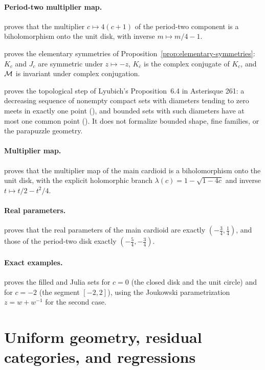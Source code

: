 \paragraph{Period-two multiplier map.}
 proves that the multiplier $c\mapsto4(c+1)$ of the period-two component is a biholomorphism onto the unit disk, with inverse $m\mapsto m/4-1$.

 proves the elementary symmetries of Proposition~\ref{prop:elementary-symmetries}:
$K_c$ and $J_c$ are symmetric under $z\mapsto -z$, $K_{\bar c}$ is the complex conjugate of $K_c$, and $\mathcal M$ is invariant
under complex conjugation.

 proves the topological step of Lyubich's Proposition~6.4 in Asterisque 261: a decreasing sequence of nonempty compact sets with diameters tending to zero meets in exactly one point (), and bounded sets with such diameters have at most one common point ().  It does not formalize bounded shape, fine families, or the parapuzzle geometry.

\paragraph{Multiplier map.}
 proves that the multiplier map of the main cardioid is a biholomorphism onto the unit disk, with the explicit holomorphic branch $\lambda(c)=1-\sqrt{1-4c}$ and inverse $t\mapsto t/2-t^2/4$.

\paragraph{Real parameters.}
 proves that the real parameters of the main cardioid are exactly $(-\tfrac34,\tfrac14)$, and those of the period-two disk exactly $(-\tfrac54,-\tfrac34)$.

\paragraph{Exact examples.}
 proves the filled and Julia sets for $c=0$ (the closed disk and the unit circle) and for $c=-2$ (the segment $[-2,2]$), using the Joukowski parametrization $z=w+w^{-1}$ for the second case.

\section{Uniform geometry, residual categories, and regressions}

